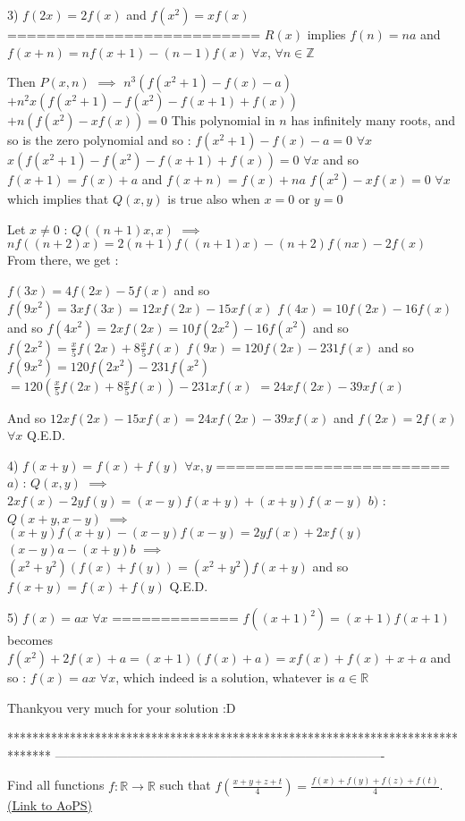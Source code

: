 \begin{solution}
3) $f(2x)=2f(x)$ and $f(x^2)=xf(x)$
==========================
$R(x)$ implies $f(n)=na$ and $f(x+n)=nf(x+1)-(n-1)f(x)$ $\forall x$, $\forall n\in\mathbb Z$

Then $P(x,n)$ $\implies$ $n^3(f(x^2+1)-f(x)-a)$ $+n^2x(f(x^2+1)-f(x^2)-f(x+1)+f(x))$ $+n(f(x^2)-xf(x))=0$
This polynomial in $n$ has infinitely many roots, and so is the zero polynomial and so :
$f(x^2+1)-f(x)-a=0$ $\forall x$
$x(f(x^2+1)-f(x^2)-f(x+1)+f(x))=0$ $\forall x$ and so $f(x+1)=f(x)+a$ and $f(x+n)=f(x)+na$
$f(x^2)-xf(x)=0$ $\forall x$ which implies that $Q(x,y)$ is true also when $x=0$ or $y=0$

Let $x\ne 0$ :
$Q((n+1)x,x)$ $\implies$ $nf((n+2)x)=2(n+1)f((n+1)x)-(n+2)f(nx)-2f(x)$
From there, we get :

$f(3x)=4f(2x)-5f(x)$ and so $f(9x^2)=3xf(3x)=12xf(2x)-15xf(x)$
$f(4x)=10f(2x)-16f(x)$ and so $f(4x^2)=2xf(2x)=10f(2x^2)-16f(x^2)$ and so $f(2x^2)=\frac x5f(2x)+8\frac x5f(x)$
$f(9x)=120f(2x)-231f(x)$ and so $f(9x^2)=120f(2x^2)-231f(x^2)$ $=120(\frac x5f(2x)+8\frac x5f(x))-231xf(x)$ $=24xf(2x)-39xf(x)$

And so $12xf(2x)-15xf(x)=24xf(2x)-39xf(x)$ and $f(2x)=2f(x)$ $\forall x$
Q.E.D.

4) $f(x+y)=f(x)+f(y)$ $\forall x,y$
========================
$a)$ : $Q(x,y)$ $\implies$ $2xf(x)-2yf(y)=(x-y)f(x+y)+(x+y)f(x-y)$
$b)$ :$Q(x+y,x-y)$ $\implies$ $(x+y)f(x+y)-(x-y)f(x-y)=2yf(x)+2xf(y)$
$(x-y)a - (x+y)b$ $\implies$  $(x^2+y^2)(f(x)+f(y))=(x^2+y^2)f(x+y)$ and so $f(x+y)=f(x)+f(y)$
Q.E.D.

5) $f(x)=ax$ $\forall x$
=============
$f((x+1)^2)=(x+1)f(x+1)$ becomes $f(x^2)+2f(x)+a=(x+1)(f(x)+a)=xf(x)+f(x)+x+a$ and so :
$\boxed{f(x)=ax}$ $\forall x$, which indeed is a solution, whatever is $a\in\mathbb R$
\end{solution}



\begin{solution}
	Thankyou very much for your solution :D
\end{solution}
*******************************************************************************
-------------------------------------------------------------------------------

\begin{problem}
	Find all functions $f: \mathbb{R}\to\mathbb{R}$ such that $f(\frac{x+y+z+t}{4})=\frac{f(x)+f(y)+f(z)+f(t)}{4}$.
	\flushright \href{https://artofproblemsolving.com/community/c6h567268}{(Link to AoPS)}
\end{problem}




